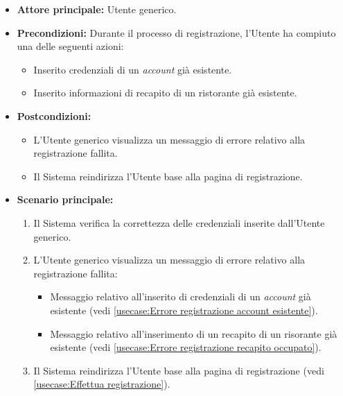 \label{usecase:Visualizzazione errore di registrazione}

\begin{itemize}
	\item \textbf{Attore principale:} Utente generico.
	\item \textbf{Precondizioni:}
    Durante il processo di registrazione, l'Utente ha compiuto una delle seguenti azioni:
    \begin{itemize}
        \item Inserito credenziali di un \textit{account} già esistente.
        \item Inserito informazioni di recapito di un ristorante già esistente.
    \end{itemize}
	\item \textbf{Postcondizioni:} 
	\begin{itemize}
        \item L'Utente generico visualizza un messaggio di errore relativo alla registrazione fallita.
        \item Il Sistema reindirizza l'Utente base alla pagina di registrazione.
    \end{itemize}

	\item \textbf{Scenario principale:}
	\begin{enumerate}
            \item Il Sistema verifica la correttezza delle credenziali inserite dall'Utente generico.
            \item L'Utente generico visualizza un messaggio di errore relativo alla registrazione fallita:
                \begin{itemize}
                    \item Messaggio relativo all'inserito di credenziali di un \textit{account} già esistente (vedi \autoref{usecase:Errore registrazione account esistente}).
                    \item Messaggio relativo all'inserimento di un recapito di un risorante già esistente (vedi \autoref{usecase:Errore registrazione recapito occupato}).
                \end{itemize}
            \item Il Sistema reindirizza l'Utente base alla pagina di registrazione (vedi \autoref{usecase:Effettua registrazione}).   
    \end{enumerate}
	
\end{itemize}


